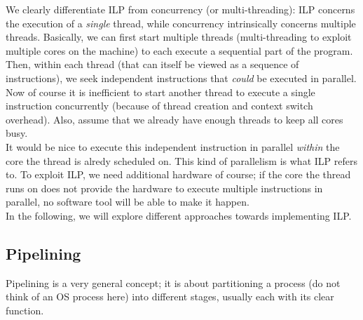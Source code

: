 \documentclass[main.tex]{subfiles}
\begin{document}
We clearly differentiate ILP from concurrency (or multi-threading): ILP concerns the execution of a \textit{single} thread, while concurrency intrinsically concerns multiple threads. Basically, we can first start multiple threads (multi-threading to exploit multiple cores on the machine) to each execute a sequential part of the program. Then, within each thread (that can itself be viewed as a sequence of instructions), we seek independent instructions that \textit{could} be executed in parallel. Now of course it is inefficient to start another thread to execute a single instruction concurrently (because of thread creation and context switch overhead). Also, assume that we already have enough threads to keep all cores busy.\\
It would be nice to execute this independent instruction in parallel \textit{within} the core the thread is alredy scheduled on. This kind of parallelism is what ILP refers to. To exploit ILP, we need additional hardware of course; if the core the thread runs on does not provide the hardware to execute multiple instructions in parallel, no software tool will be able to make it happen.\\
In the following, we will explore different approaches towards implementing ILP.

\subsection{Pipelining}
Pipelining is a very general concept; it is about partitioning a process (do not think of an OS process here) into different stages, usually each with its clear function.
\end{document}
